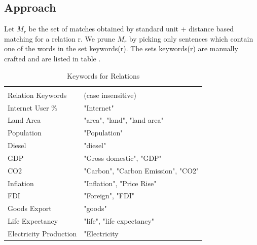 \documentclass[a4paper,10pt]{article}
\begin{document}
\subsection{Approach}
Let $M_r$ be the set of matches obtained by standard unit + distance based matching for a relation r.
We prune $M_r$ by picking only sentences which contain one of the words in the set keywords(r).
The sets keywords(r) are manually crafted and are listed in table \cite{fig:kw}.

\begin{center}
\begin{table}
 \begin{tabular}{|l|l|}
\hline \\
 Relation Keywords & (case insensitive)\\
\hline
 Internet User \% &"Internet"\\
Land Area &"area", "land", "land area"\\
Population &"Population"\\
Diesel &"diesel"\\
GDP &"Gross domestic", "GDP"\\
CO2 &"Carbon", "Carbon Emission", "CO2"\\
Inflation &"Inflation", "Price Rise"\\
FDI &"Foreign", "FDI"\\
Goods Export & "goods"\\
Life Expectancy & "life", "life expectancy"\\
Electricity Production & "Electricity\\
\hline
\end{tabular}
\caption{Keywords for Relations}
\label{fig:kw}
\end{table}
 \end{center}
\end{document}
